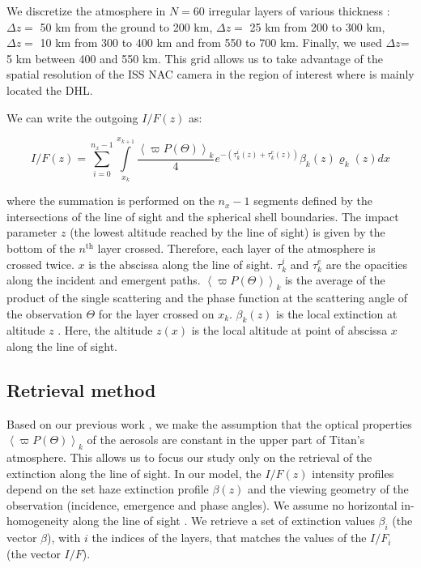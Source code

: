We discretize the atmosphere in $N = 60$ irregular layers of various thickness : $\Delta z =$ 50 km from the
ground to 200 km, $\Delta z =$ 25 km from 200 to 300 km, $\Delta z =$ 10 km from 300 to 400 km and from 550 to 700 km.
Finally, we used $\Delta z$= 5 km between 400 and 550 km. This grid allows us to take advantage of the spatial resolution
of the ISS NAC camera in the region of interest where is mainly located the DHL.

We can write the outgoing $I/F (z)$ as:

\begin{equation}
I/F (z) = \sum_{i=0}^{n_x-1} \int\limits_{x_k}^{x_{k+1}}
\frac{\left< \varpi P(\Theta) \right>_k}{4}
e^{-\left( \tau^i_k\left(z\right) + \tau^e_k\left(z\right) \right)}
\beta_k\left(z\right) \varrho_k\left(z\right) d{x}
\label{eq:west2017_sup_limb}
\end{equation}

where the summation is performed on the $n_x-1$ segments defined by the intersections of the line of sight and the spherical shell boundaries. The impact parameter $z$ (the lowest altitude reached by the line of sight) is given by the bottom of the $n^\mathrm{th}$ layer crossed. Therefore, each layer of the atmosphere is crossed twice. $x$ is the abscissa along the line of sight. $\tau^i_k$ and $\tau^e_k$ are the opacities along the incident and emergent paths.
$\left< \varpi P(\Theta)\right>_k$ is the average of the product of the single scattering and the phase function at the scattering angle of the observation $\Theta$ for the layer crossed on $x_k$.  $\beta_k(z)$ is the local extinction  at altitude $z$ . Here, the altitude $z(x)$ is the local altitude at point of abscissa $x$ along the line of sight.


\subsection{Retrieval method}

Based on our previous work \citep{Seignovert2017, West2018}, we make the assumption that the optical properties $\left<\varpi P(\Theta)\right>_k$ of the aerosols are constant in the upper part of Titan's atmosphere. This allows us to focus our study only on the retrieval of the extinction along the line of sight.
In our model, the $I/F (z)$ intensity profiles depend on the set haze extinction profile $\beta(z)$ and the viewing geometry of the observation (incidence, emergence and phase angles).
We assume no horizontal in-homogeneity along the line of sight \citep{Seignovert2017}. We retrieve a set of extinction values $\beta_i$ (the vector ${\beta}$), with $i$ the indices of the layers, that matches the values of the $I/F_i$ (the vector $I/F$).

